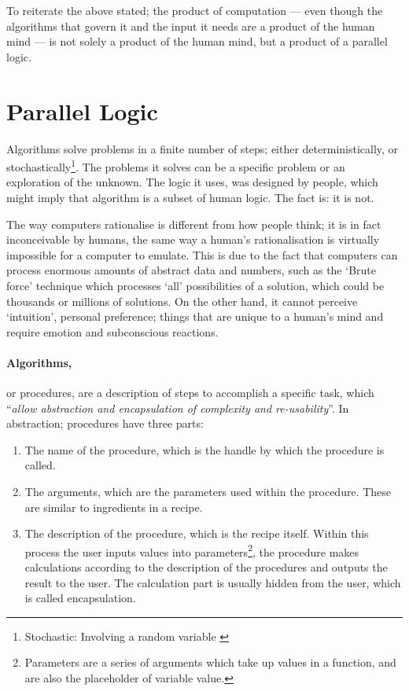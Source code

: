 To reiterate the above stated; the product of computation --- even though the algorithms that govern it and the input it needs are a product of the human mind --- is not solely a product of the human mind, but a product of a parallel logic.

\section{Parallel Logic}

\label{ParallelLogic}
Algorithms solve problems in a finite number of steps; either deterministically, or stochastically\footnote{Stochastic: Involving a random variable \cite{merriam03}}. The problems it solves can be a specific problem or an exploration of the unknown. The logic it uses, was designed by people, which might imply that algorithm is a subset of human logic. The fact is: it is not.

The way computers rationalise is different from how people think; it is in fact inconceivable by humans, the same way a human's rationalisation is virtually impossible for a computer to emulate.  This is due to the fact that computers can process enormous amounts of abstract data and numbers, such as the `Brute force' technique which processes `all' possibilities of a solution, which could be thousands or millions of solutions. On the other hand, it cannot perceive `intuition', personal preference; things that are unique to a human's mind and require emotion and subconscious reactions.

\paragraph{Algorithms,}or procedures, are a description of steps to accomplish a specific task, which ``\emph{allow abstraction and encapsulation of complexity and re-usability}''\cite{hernandez06}. In abstraction; procedures have three parts:
\begin{enumerate}
  \item The name of the procedure, which is the handle by which the procedure is called.
  \item The arguments, which are the parameters used within the procedure. These are similar to ingredients in a recipe.
  \item The description of the procedure, which is the recipe itself. Within this process the user inputs values into parameters\footnote{Parameters are a series of arguments which take up values in a function, and are also the placeholder of variable value.}, the procedure makes calculations according to the description of the procedures and outputs the result to the user. The calculation part is usually hidden from the user, which is called encapsulation.
\end{enumerate}

